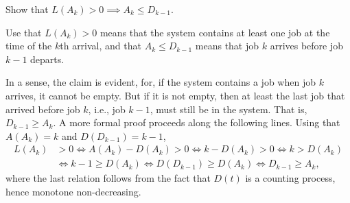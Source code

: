 \begin{exercise} Show  that $L(A_k)>0 \implies A_k \leq D_{k-1}$.
  \begin{hint} Use that $L(A_k)>0$ means that the system contains at least one
  job at the time of the $k$th arrival, and that $A_k \leq D_{k-1}$ means that
  job $k$ arrives before job $k-1$ departs.
  \end{hint}
\begin{solution}  In a sense, the claim is evident, for, if the system contains a
  job when job $k$ arrives, it cannot be empty. But if it is not
  empty, then at least the last job that arrived before job $k$, i.e.,
  job $k-1$, must still be in the system. That is, $D_{k-1} \geq A_k$. A more formal proof proceeds along the following lines. Using that $A(A_k) = k$ and $D(D_{k-1})= k-1$, 
  \begin{equation*}
    \begin{split}
      L(A_k) &> 0 \Leftrightarrow A(A_k) - D(A_k) > 0   \Leftrightarrow k - D(A_k) > 0 \Leftrightarrow k > D(A_k) \\
      &\Leftrightarrow k-1 \geq D(A_k) \Leftrightarrow D(D_{k-1}) \geq D(A_k) \Leftrightarrow D_{k-1} \geq A_k, 
    \end{split}
  \end{equation*}
  where the last relation follows from the fact that $D(t)$ is a
  counting process, hence monotone non-decreasing.
\end{solution}
\end{exercise}



